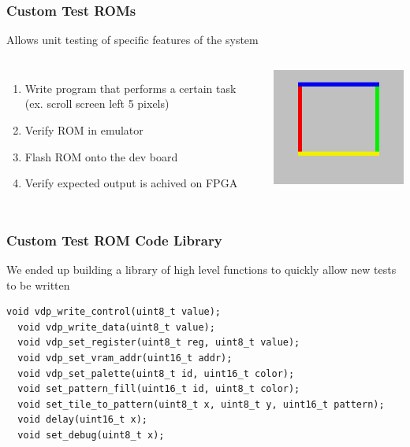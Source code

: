 \documentclass[xcolor=table]{beamer}
\newlength{\wideitemsep}
\let\olditem\item
\renewcommand{\item}{\setlength{\itemsep}{\wideitemsep}\olditem}
\begin{document}
\begin{frame}
    \frametitle{Custom Test ROMs}
    Allows unit testing of specific features of the system
    \vspace{\baselineskip}
    \begin{columns}[c]
        \begin{enumerate}
            \item Write program that performs a certain task (ex. scroll screen left 5 pixels)
            \item Verify ROM in emulator
            \item Flash ROM onto the dev board
            \item Verify expected output is achived on FPGA
        \end{enumerate}
        \includegraphics[width=\textwidth]{../images/scroll.png}
    \end{columns}
\end{frame}

\begin{frame}[fragile]
    \frametitle{Custom Test ROM Code Library}
    We ended up building a library of high level functions to quickly allow new tests to be written
    \begin{lstlisting}[basicstyle=\ttfamily\scriptsize]
  void vdp_write_control(uint8_t value);
  void vdp_write_data(uint8_t value);
  void vdp_set_register(uint8_t reg, uint8_t value);
  void vdp_set_vram_addr(uint16_t addr);
  void vdp_set_palette(uint8_t id, uint16_t color);
  void set_pattern_fill(uint16_t id, uint8_t color);
  void set_tile_to_pattern(uint8_t x, uint8_t y, uint16_t pattern);
  void delay(uint16_t x);
  void set_debug(uint8_t x);
    \end{lstlisting}
\end{frame}
\end{document}
